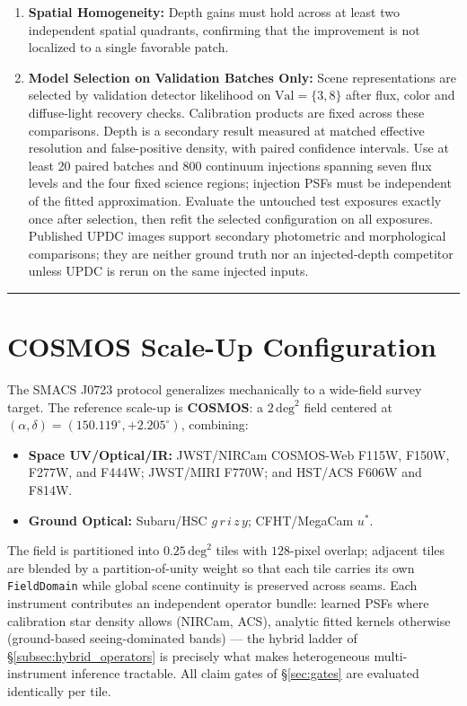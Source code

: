 \documentclass[11pt,a4paper]{article}
\begin{document}
\begin{enumerate}
\begin{enumerate}
        \item \emph{Production Refit:} Only after confirmation are all exposures combined for final science products.
    \end{enumerate}
    \item \textbf{Spatial Homogeneity:}
    Depth gains must hold across at least two independent spatial quadrants, confirming that the improvement is not localized to a single favorable patch.
    \item \textbf{Model Selection on Validation Batches Only:}
    Scene representations are selected by validation detector likelihood on $\mathrm{Val}=\{3,8\}$ after flux, color and diffuse-light recovery checks. Calibration products are fixed across these comparisons. Depth is a secondary result measured at matched effective resolution and false-positive density, with paired confidence intervals. Use at least 20 paired batches and 800 continuum injections spanning seven flux levels and the four fixed science regions; injection PSFs must be independent of the fitted approximation. Evaluate the untouched test exposures exactly once after selection, then refit the selected configuration on all exposures. Published UPDC images support secondary photometric and morphological comparisons; they are neither ground truth nor an injected-depth competitor unless UPDC is rerun on the same injected inputs.
\end{enumerate}

\vspace{1em}
\hrule
\vspace{1em}

\section{COSMOS Scale-Up Configuration}
\label{sec:cosmos}
The SMACS J0723 protocol generalizes mechanically to a wide-field survey target. The reference scale-up is \textbf{COSMOS}: a $2\,\mathrm{deg}^2$ field centered at $(\alpha, \delta) = (150.119^\circ, +2.205^\circ)$, combining:
\begin{itemize}
    \item \textbf{Space UV/Optical/IR:}
    JWST/NIRCam COSMOS-Web F115W, F150W, F277W, and F444W;
    JWST/MIRI F770W; and HST/ACS F606W and F814W.
    \item \textbf{Ground Optical:} Subaru/HSC $g\,r\,i\,z\,y$; CFHT/MegaCam $u^{*}$.
\end{itemize}
The field is partitioned into $0.25\,\mathrm{deg}^2$ tiles with $128$-pixel overlap; adjacent tiles are blended by a partition-of-unity weight so that each tile carries its own \texttt{FieldDomain} while global scene continuity is preserved across seams. Each instrument contributes an independent operator bundle: learned PSFs where calibration star density allows (NIRCam, ACS), analytic fitted kernels otherwise (ground-based seeing-dominated bands) --- the hybrid ladder of \S\ref{subsec:hybrid_operators} is precisely what makes heterogeneous multi-instrument inference tractable. All claim gates of \S\ref{sec:gates} are evaluated identically per tile.
\end{document}
